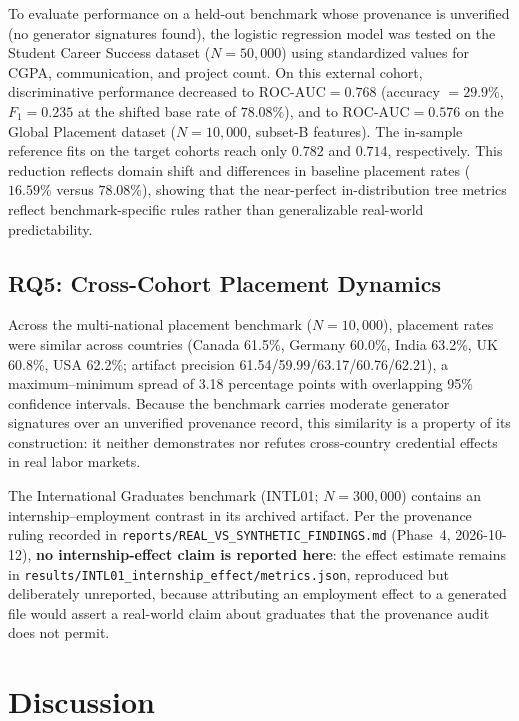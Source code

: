 \documentclass[journal]{IEEEtran}
\begin{document}
To evaluate performance on a held-out benchmark whose provenance is unverified (no generator signatures found), the logistic regression model was tested on the Student Career Success dataset ($N = 50,000$) using standardized values for CGPA, communication, and project count. On this external cohort, discriminative performance decreased to $\text{ROC-AUC} = 0.768$ (accuracy $= 29.9\%$, $F_1 = 0.235$ at the shifted base rate of $78.08\%$), and to $\text{ROC-AUC} = 0.576$ on the Global Placement dataset ($N = 10{,}000$, subset-B features). The in-sample reference fits on the target cohorts reach only $0.782$ and $0.714$, respectively. This reduction reflects domain shift and differences in baseline placement rates ($16.59\%$ versus $78.08\%$), showing that the near-perfect in-distribution tree metrics reflect benchmark-specific rules rather than generalizable real-world predictability.

\subsection{RQ5: Cross-Cohort Placement Dynamics}
\label{sec:rq5_p}

Across the multi-national placement benchmark ($N = 10,000$), placement rates were similar across countries (Canada 61.5\%, Germany 60.0\%, India 63.2\%, UK 60.8\%, USA 62.2\%; artifact precision 61.54/59.99/63.17/60.76/62.21), a maximum--minimum spread of 3.18 percentage points with overlapping 95\% confidence intervals. Because the benchmark carries moderate generator signatures over an unverified provenance record, this similarity is a property of its construction: it neither demonstrates nor refutes cross-country credential effects in real labor markets.

The International Graduates benchmark (INTL01; $N = 300{,}000$) contains an internship--employment contrast in its archived artifact. Per the provenance ruling recorded in \texttt{reports/REAL\_VS\_SYNTHETIC\_FINDINGS.md} (Phase~4, 2026-10-12), \textbf{no internship-effect claim is reported here}: the effect estimate remains in \texttt{results/INTL01\_internship\_effect/metrics.json}, reproduced but deliberately unreported, because attributing an employment effect to a generated file would assert a real-world claim about graduates that the provenance audit does not permit.

\section{Discussion}
\label{sec:discussion_p}
\end{document}
